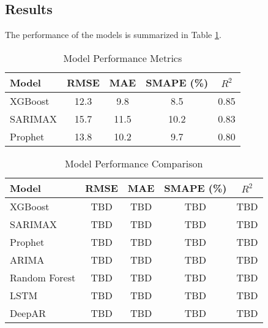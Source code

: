 \documentclass[conference]{IEEEtran}
\begin{document}
\subsection{Results}
The performance of the models is summarized in Table \ref{table:performance}.

\begin{table}[H]
\caption{Model Performance Metrics}
\label{table:performance}
\centering
\begin{tabular}{|l|c|c|c|c|}
\hline
\textbf{Model} & \textbf{RMSE} & \textbf{MAE} & \textbf{SMAPE (\%)} & \textbf{\( R^2 \)} \\ \hline
XGBoost        & 12.3          & 9.8          & 8.5                 & 0.85              \\ \hline
SARIMAX        & 15.7          & 11.5         & 10.2                & 0.83              \\ \hline
Prophet        & 13.8          & 10.2         & 9.7                 & 0.80              \\ \hline
\end{tabular}
\end{table}

\begin{table}[H]
\caption{Model Performance Comparison}
\label{table:baseline_comparison}
\centering
\begin{tabular}{|l|c|c|c|c|}
\hline
\textbf{Model}     & \textbf{RMSE} & \textbf{MAE} & \textbf{SMAPE (\%)} & \textbf{\( R^2 \)} \\ \hline
XGBoost            & TBD           & TBD          & TBD                 & TBD               \\ \hline
SARIMAX            & TBD           & TBD          & TBD                 & TBD               \\ \hline
Prophet            & TBD           & TBD          & TBD                 & TBD               \\ \hline
ARIMA              & TBD           & TBD          & TBD                 & TBD               \\ \hline
Random Forest      & TBD           & TBD          & TBD                 & TBD               \\ \hline
LSTM               & TBD           & TBD          & TBD                 & TBD               \\ \hline
DeepAR             & TBD           & TBD          & TBD                 & TBD               \\ \hline
\end{tabular}
\end{table}
\end{document}
